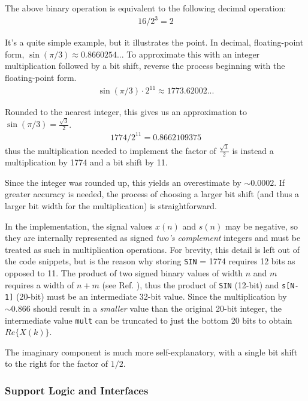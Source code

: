 \documentclass[reprint,amsmath,amssymb]{revtex4-2}
\begin{document}
The above binary operation is equivalent to the following decimal operation:
\begin{align*}
    16 / 2^{3} = 2
\end{align*}

It's a quite simple example, but it illustrates the point. In decimal, floating-point form, $\sin(\pi/3) \approx 0.8660254...$ To approximate this with an integer multiplication followed by a bit shift, reverse the process beginning with the floating-point form.
\begin{align*}
    \sin(\pi/3) \cdot 2^{11} \approx 1773.62002...
\end{align*}

Rounded to the nearest integer, this gives us an approximation to $\sin(\pi / 3) = \frac{\sqrt{3}}{2}$.
\begin{align}
    1774 / 2^{11} = 0.8662109375
\end{align}
thus the multiplication needed to implement the factor of $\frac{\sqrt{3}}{2}$ is instead a multiplication by 1774 and a bit shift by 11.

Since the integer was rounded up, this yields an overestimate by $\sim 0.0002$. If greater accuracy is needed, the process of choosing a larger bit shift (and thus a larger bit width for the multiplication) is straightforward. 

In the implementation, the signal values $x(n)$ and $s(n)$ may be negative, so they are internally represented as signed \textit{two's complement} integers and must be treated as such in multiplication operations. For brevity, this detail is left out of the code snippets, but is the reason why storing \verb|SIN| = 1774 requires 12 bits as opposed to 11. The product of two signed binary values of width $n$ and $m$ requires a width of $n+m$ (see Ref. \cite{fixed-point}), thus the product of \verb|SIN| (12-bit) and \verb|s[N-1]| (20-bit) must be an intermediate 32-bit value. Since the multiplication by $\sim 0.866$ should result in a \textit{smaller} value than the original 20-bit integer, the intermediate value \verb|mult| can be truncated to just the bottom 20 bits to obtain $Re\{X(k)\}$. 

The imaginary component is much more self-explanatory, with a single bit shift to the right for the factor of $1/2$.

\subsubsection{Support Logic and Interfaces}
\end{document}
